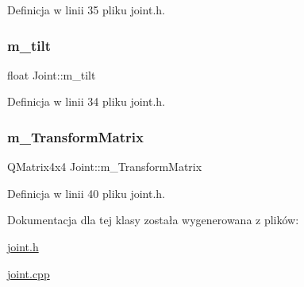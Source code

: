 Definicja w linii 35 pliku joint.\+h.

\mbox{\label{class_joint_abe644639021eba36f36ec04a90d13af4}} 
\subsubsection{\texorpdfstring{m\+\_\+tilt}{m\_tilt}}
{\footnotesize\ttfamily float Joint\+::m\+\_\+tilt\hspace{0.3cm}{\ttfamily [protected]}}



Definicja w linii 34 pliku joint.\+h.

\mbox{\label{class_joint_adc692e48ac1dc140134627aa445dc160}} 
\subsubsection{\texorpdfstring{m\+\_\+\+Transform\+Matrix}{m\_TransformMatrix}}
{\footnotesize\ttfamily Q\+Matrix4x4 Joint\+::m\+\_\+\+Transform\+Matrix\hspace{0.3cm}{\ttfamily [protected]}}



Definicja w linii 40 pliku joint.\+h.



Dokumentacja dla tej klasy została wygenerowana z plików\+:\begin{DoxyCompactItemize}
\item 
\hyperlink{joint_8h}{joint.\+h}\item 
\hyperlink{joint_8cpp}{joint.\+cpp}\end{DoxyCompactItemize}
